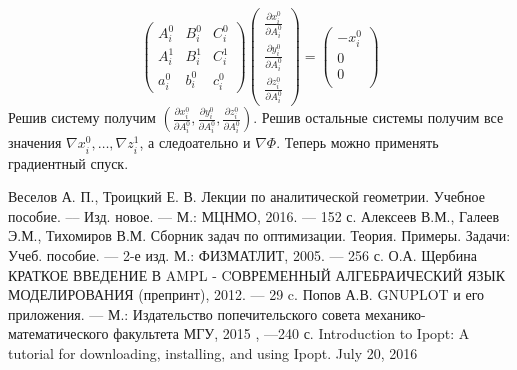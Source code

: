 \documentclass[14pt,fleqn,a4paper]{scrartcl}
\begin{document}
$$
\begin{pmatrix}
A_{i}^{0} & B_{i}^{0} & C_{i}^{0} \\
A_{i}^{1} & B_{i}^{1} & C_{i}^{1} \\
a_{i}^{0} & b_{i}^{0} & c_{i}^{0} 
\end{pmatrix}
\begin{pmatrix}
\frac{\partial x_{i}^{0}}{\partial A_{i}^{0}} \\
\frac{\partial y_{i}^{0}}{\partial A_{i}^{0}} \\
\frac{\partial z_{i}^{0}}{\partial A_{i}^{0}}
\end{pmatrix}
=
\begin{pmatrix}
-x_{i}^{0}\\
0\\
0\\
\end{pmatrix}
$$
Решив систему получим $(\frac{\partial x_{i}^{0}}{\partial A_{i}^{0}}, \frac{\partial y_{i}^{0}}{\partial A_{i}^{0}},\frac{\partial z_{i}^{0}}{\partial A_{i}^{0}})$. Решив остальные системы получим все значения $\nabla x_{i}^{0}, \hdots, \nabla  z_{i}^{1}$, а следоательно и $\nabla \Phi$. Теперь можно применять градиентный спуск. 
\newpage
\begin{thebibliography}{5}
Веселов А. П., Троицкий Е. В. Лекции по аналитической геометрии. Учебное пособие. –– Изд. новое. –– М.: МЦНМО, 2016. –– 152 с. 
Алексеев В.М., Галеев Э.М., Тихомиров В.М. Сборник задач по оптимизации. Теория. Примеры. Задачи: Учеб. пособие. --- 2-е изд. М.: ФИЗМАТЛИТ, 2005. --- 256 с.
О.А. Щербина КРАТКОЕ ВВЕДЕНИЕ В AMPL - CОВРЕМЕННЫЙ АЛГЕБРАИЧЕСКИЙ ЯЗЫК МОДЕЛИРОВАНИЯ (препринт), 2012. --- 29 c. 
Попов А.В. GNUPLOT и его приложения. --- М.: Издательство попечительского совета механико-математического факультета МГУ, 2015 , ---240 с. 
 Introduction to Ipopt: A tutorial for downloading, installing, and using Ipopt. July 20, 2016
\end{thebibliography}
\end{document}
